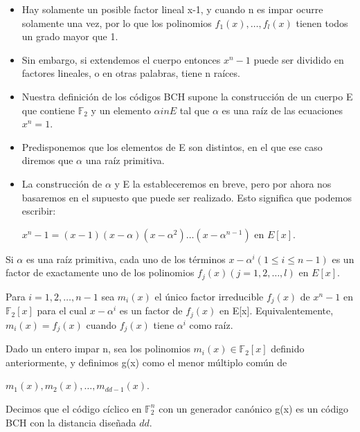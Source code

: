 \begin{frame}  \small  
\begin{itemize} 

\item  Hay solamente un posible factor lineal x-1, y cuando n es impar ocurre solamente una vez, por lo que los polinomios $f_1(x), \ldots , f_l(x)$ tienen todos un grado mayor que 1. 

\item Sin embargo, si extendemos el cuerpo entonces $x^n-1$ puede ser dividido en factores lineales, o en otras palabras, tiene n raíces. 

\item Nuestra definición de los códigos BCH supone la construcción de un cuerpo E que contiene $\mathbb{F}_2$ y un elemento $\alpha in E$ tal que $\alpha$ es una raíz de las ecuaciones $x^n=1$. 

\item Predisponemos que los elementos de E son distintos, en el que ese caso diremos que $\alpha$ una raíz primitiva. 

\item La construcción de $\alpha$ y E la estableceremos en breve, pero por ahora nos basaremos en el supuesto que puede ser realizado. Esto significa que podemos escribir:

\begin{center}
$x^n -1 = (x-1)(x-\alpha)(x-\alpha^2) \ldots (x-\alpha^{n-1})$ en $E[x]$.
\end{center}

\end{itemize} \end{frame} 


\begin{frame}  \small  

\begin{lema}
Si $\alpha$ es una raíz primitiva, cada uno de los términos $x-\alpha^{i} (1\leq i \leq n-1)$ es un factor de exactamente uno de los polinomios $f_j(x) (j = 1,2,\ldots ,l)$ en $E[x]$.
\end{lema}

Para $i = 1,2,\ldots ,n-1$ sea $m_i(x)$ el único factor irreducible $f_j(x)$ de $x^n-1$ en $\mathbb{F}_2[x]$ para el cual $x-\alpha^i$ es un factor de $f_j(x)$ en E[x]. Equivalentemente, $m_i(x)=f_j(x)$ cuando $f_j(x)$ tiene $\alpha^i$ como raíz.

\begin{definicion}
Dado un entero impar n, sea los polinomios $m_i(x) \in \mathbb{F}_2[x]$ definido anteriormente, y definimos g(x) como el menor múltiplo común de 


\begin{center}
$m_1(x), m_2(x), \ldots ,m_{dd-1}(x). $
\end{center}

Decimos que el código cíclico en $\mathbb{F}_2^n$ con un generador canónico g(x) es un código BCH con la distancia diseñada $dd$.
\end{definicion}

\end{frame} 


